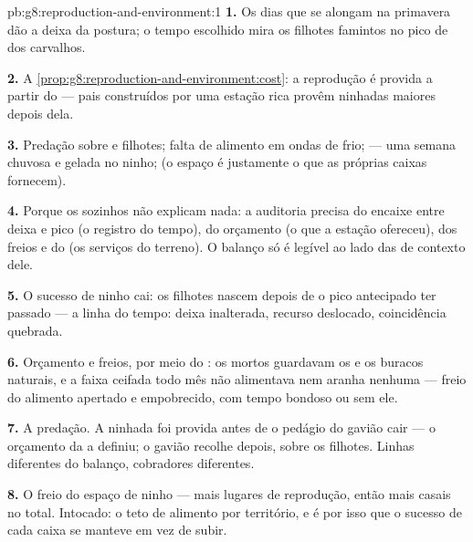 \begin{solution}{pb:g8:reproduction-and-environment:1}
\textbf{1.} Os dias que se alongam na primavera dão a deixa da
postura; o tempo escolhido mira os filhotes famintos no pico de
 dos carvalhos.

\textbf{2.} A \cref{prop:g8:reproduction-and-environment:cost}: a
reprodução é provida a partir do  --- pais construídos por uma
estação rica provêm ninhadas maiores depois dela.

\textbf{3.} Predação sobre  e filhotes; falta de alimento em ondas
de frio;  --- uma semana chuvosa e gelada no ninho; (o espaço
é justamente o que as próprias caixas fornecem).

\textbf{4.} Porque os  sozinhos não explicam nada: a auditoria
precisa do encaixe entre deixa e pico (o registro do tempo), do
orçamento (o que a estação ofereceu), dos freios e do  (os
serviços do terreno). O balanço só é legível ao lado das  de
contexto dele.

\textbf{5.} O sucesso de ninho cai: os filhotes nascem depois de o
pico antecipado ter passado --- a linha do tempo: deixa inalterada,
recurso deslocado, coincidência quebrada.

\textbf{6.} Orçamento e freios, por meio do : os  mortos
guardavam os  e os buracos naturais, e a faixa ceifada todo mês
não alimentava  nem aranha nenhuma --- freio do alimento
apertado e  empobrecido, com tempo bondoso ou sem ele.

\textbf{7.} A predação. A ninhada foi provida antes de o pedágio do
gavião cair --- o orçamento da  a definiu; o gavião recolhe
depois, sobre os filhotes. Linhas diferentes do balanço, cobradores
diferentes.

\textbf{8.} O freio do espaço de ninho --- mais lugares de reprodução,
então mais casais no total. Intocado: o teto de alimento por
território, e é por isso que o sucesso de cada caixa se manteve em vez
de subir.


\end{solution}
